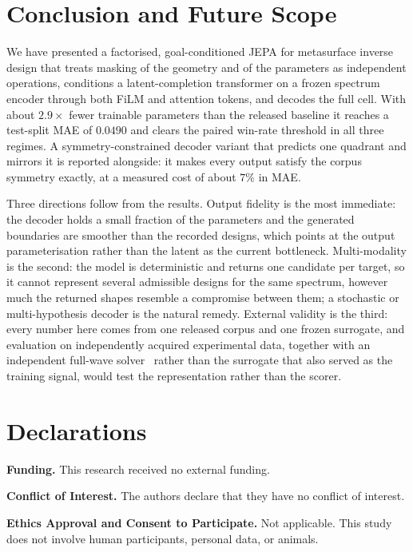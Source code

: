 \documentclass[pdflatex,oneside,sn-mathphys-num]{sn-jnl}
\theoremstyle{thmstyleone}
\theoremstyle{thmstyletwo}
\theoremstyle{thmstylethree}
\begin{document}
\section{Conclusion and Future Scope}\label{sec5}

We have presented a factorised, goal-conditioned JEPA for metasurface inverse design
that treats masking of the geometry and of the parameters as independent operations,
conditions a latent-completion transformer on a frozen spectrum encoder through both
FiLM and attention tokens, and decodes the full cell. With about $2.9\times$ fewer
trainable parameters than the released baseline it reaches a test-split MAE of $0.0490$
and clears the paired win-rate threshold in all three regimes. A symmetry-constrained
decoder variant that predicts one quadrant and mirrors it is reported alongside: it makes
every output satisfy the corpus symmetry exactly, at a measured cost of about $7\%$ in MAE.

Three directions follow from the results. Output fidelity is the most immediate: the
decoder holds a small fraction of the parameters and the generated boundaries are
smoother than the recorded designs, which points at the output parameterisation rather
than the latent as the current bottleneck. Multi-modality is the second: the model is
deterministic and returns one candidate per target, so it cannot represent several
admissible designs for the same spectrum, however much the returned shapes resemble a
compromise between them; a stochastic or multi-hypothesis decoder is the natural remedy. External
validity is the third: every number here comes from one released corpus and one frozen
surrogate, and evaluation on independently acquired experimental data, together with
an independent full-wave solver~\cite{meep,maxim} rather than the surrogate that also
served as the training signal, would test the representation rather than the scorer.

\section*{Declarations}

\noindent\textbf{Funding.} This research received no external funding.

\vspace{0.3em}
\noindent\textbf{Conflict of Interest.} The authors declare that they have no conflict of interest.

\vspace{0.3em}
\noindent\textbf{Ethics Approval and Consent to Participate.} Not applicable. This study does not involve human participants, personal data, or animals.
\end{document}
